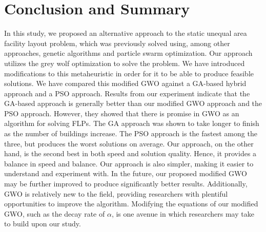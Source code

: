 \chapter{Conclusion and Summary}

In this study, we proposed an alternative approach to the static unequal area facility layout problem, which was previously solved using, among other approaches, genetic algorithms and particle swarm optimization. Our approach utilizes the grey wolf optimization to solve the problem. We have introduced modifications to this metaheuristic in order for it to be able to produce feasible solutions. We have compared this modified GWO against a GA-based hybrid approach and a PSO approach. Results from our experiment indicate that the GA-based approach is generally better than our modified GWO approach and the PSO approach. However, they showed that there is promise in GWO as an algorithm for solving FLPs. The GA approach was shown to take longer to finish as the number of buildings increase. The PSO approach is the fastest among the three, but produces the worst solutions on average. Our approach, on the other hand, is the second best in both speed and solution quality. Hence, it provides a balance in speed and balance. Our approach is also simpler, making it easier to understand and experiment with. In the future, our proposed modified GWO may be further improved to produce significantly better results. Additionally, GWO is relatively new to the field, providing researchers with plentiful opportunities to improve the algorithm. Modifying the equations of our modified GWO, such as the decay rate of $\alpha$, is one avenue in which researchers may take to build upon our study.
